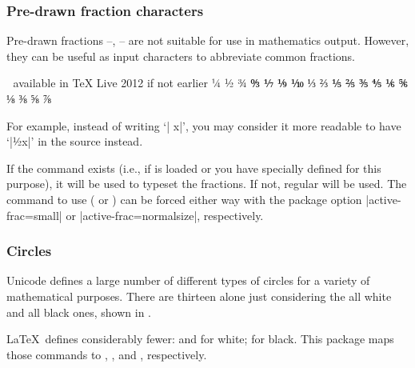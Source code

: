 \subsubsection{Pre-drawn fraction characters}

Pre-drawn fractions --, --
are not suitable for use in mathematics output. However, they can be useful
as input characters to abbreviate common fractions.
\begin{center}
 ^^A available in TeX Live 2012 if not earlier
¼ ½ ¾  ↉ ⅐ ⅑ ⅒ ⅓ ⅔ ⅕ ⅖ ⅗ ⅘ ⅙ ⅚ ⅛ ⅜ ⅝ ⅞
\end{center}
For example, instead of writing `| x|', you may consider it more readable to have
`|½x|' in the source instead.

If the  command exists (i.e., if  is loaded or
you have specially defined  for this purpose), it will be used
to typeset the fractions. If not, regular  will be used. The command
to use ( or ) can be forced either way with the package
option |active-frac=small| or |active-frac=normalsize|, respectively.

\subsubsection{Circles}

Unicode defines a large number of different types of circles for a variety
of mathematical purposes. There are thirteen alone just considering the
all white and all black ones, shown in .

\LaTeX\ defines considerably fewer:  and  for white;
 for black. This package maps those commands to ,
, and , respectively.


